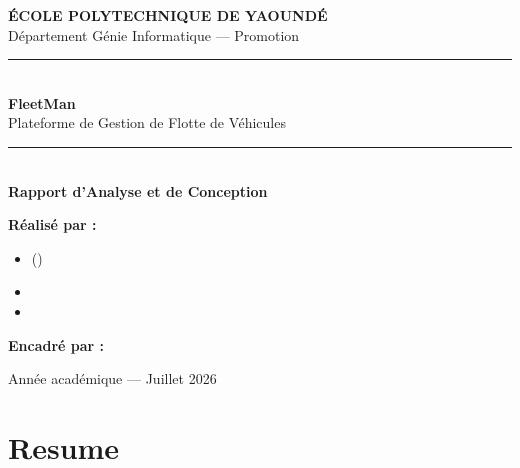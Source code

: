 \documentclass[12pt,a4paper]{report}
\begin{document}

\begin{titlepage}
  \pagecolor{secondaryColor}\color{white}\centering
  \vspace*{1.8cm}
  {\small\textbf{ÉCOLE POLYTECHNIQUE DE YAOUNDÉ}}\\[0.2cm]
  {\small Département Génie Informatique --- Promotion \FleetPromotion}\\[1.5cm]
  \textcolor{primaryColor}{\rule{0.75\textwidth}{2pt}}\\[0.6cm]
  {\fontsize{46}{56}\bfseries\textcolor{primaryColor}{FleetMan}}\\[0.4cm]
  {\Large Plateforme de Gestion de Flotte de Véhicules}\\[0.6cm]
  \textcolor{primaryColor}{\rule{0.75\textwidth}{1pt}}\\[1.2cm]
  {\LARGE\bfseries Rapport d'Analyse et de Conception}\\[2cm]
  \begin{minipage}{0.85\textwidth}
    \raggedright
    {\large\textbf{Réalisé par :}}\\[0.4cm]
    \begin{itemize}[leftmargin=1.2cm, itemsep=0.2cm]
      \item \FleetMembreA\quad(\FleetMatriculeA)
      \item \FleetMembreB
      \item \FleetMembreC
    \end{itemize}
    \vspace{0.8cm}
    {\large\textbf{Encadré par :}} \FleetEncadrant
  \end{minipage}
  \vfill
  {\small Année académique \FleetAnneeAcad --- Juillet 2026}
\end{titlepage}
\nopagecolor

\tableofcontents
\listoffigures
\listoftables

\chapter*{Resume}
\thispagestyle{fancy}
\end{document}
